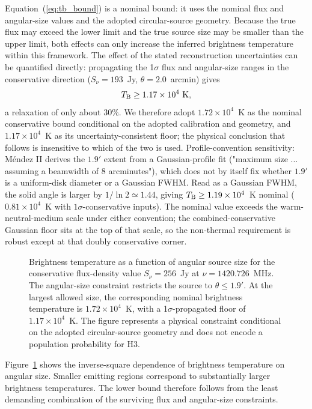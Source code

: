 \documentclass[twocolumn]{aastex701}
\newcommand{\tbeq}{T_{\rm B}}
\newcommand{\snu}{S_\nu}
\begin{document}
Equation~(\ref{eq:tb_bound}) is a nominal bound: it uses the nominal flux and angular-size values and the adopted circular-source geometry. Because the true flux may exceed the lower limit and the true source size may be smaller than the upper limit, both effects can only increase the inferred brightness temperature within this framework. The effect of the stated reconstruction uncertainties can be quantified directly: propagating the 1$\sigma$ flux and angular-size ranges in the conservative direction ($\snu=193$~Jy, $\theta=2.0$~arcmin) gives
\[
\tbeq\geq1.17\times10^4~{\rm K},
\]
a relaxation of only about $30\%$. We therefore adopt $1.72\times10^4$~K as the nominal conservative bound conditional on the adopted calibration and geometry, and $1.17\times10^4$~K as its uncertainty-consistent floor; the physical conclusion that follows is insensitive to which of the two is used. Profile-convention sensitivity: M\'endez II derives the $1.9'$ extent from a Gaussian-profile fit ("maximum size ... assuming a beamwidth of 8 arcminutes"), which does not by itself fix whether $1.9'$ is a uniform-disk diameter or a Gaussian FWHM. Read as a Gaussian FWHM, the solid angle is larger by $1/\ln2\simeq1.44$, giving $\tbeq\geq1.19\times10^4$~K nominal ($0.81\times10^4$~K with $1\sigma$-conservative inputs). The nominal value exceeds the warm-neutral-medium scale under either convention; the combined-conservative Gaussian floor sits at the top of that scale, so the non-thermal requirement is robust except at that doubly conservative corner.

\begin{figure}[ht!]
\caption{Brightness temperature as a function of angular source size for the conservative flux-density value $\snu=256$~Jy at $\nu=1420.726$~MHz. The angular-size constraint restricts the source to $\theta\leq1.9'$. At the largest allowed size, the corresponding nominal brightness temperature is $1.72\times10^4$~K, with a 1$\sigma$-propagated floor of $1.17\times10^4$~K. The figure represents a physical constraint conditional on the adopted circular-source geometry and does not encode a population probability for H3.}
\label{fig:h3_tb}
\end{figure}

Figure~\ref{fig:h3_tb} shows the inverse-square dependence of brightness temperature on angular size. Smaller emitting regions correspond to substantially larger brightness temperatures. The lower bound therefore follows from the least demanding combination of the surviving flux and angular-size constraints.
\end{document}
